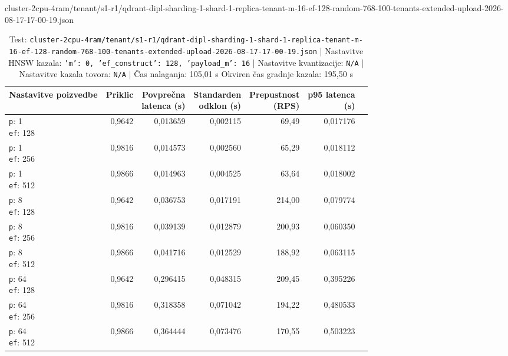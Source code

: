 \begin{table}[htbp]
  \centering
\small
  \caption{cluster-2cpu-4ram/tenant/s1-r1/qdrant-dipl-sharding-1-shard-1-replica-tenant-m-16-ef-128-random-768-100-tenants-extended-upload-2026-08-17-17-00-19.json}
  \label{tab:cluster-2cpu-4ram:tenant:s1-r1:qdrant-dipl-sharding-1-shard-1-replica-tenant-m-16-ef-128-random-768-100-tenants-extended-upload-2026-08-17-17-00-19.json}
  \begin{tabularx}{\textwidth}{Xrrrrrr}
    \toprule
    Nastavitve poizvedbe & Priklic & \makecell{Povprečna\\latenca (s)} & \makecell{Standarden\\odklon (s)} & \makecell{Prepustnost\\(RPS)} & \makecell{p95 latenca\\(s)}  \\
    \midrule
    \makecell{\texttt{p}: 1\\\texttt{ef}: 128} & 0,9642 & 0,013659 & 0,002115 & 69,49 & 0,017176 \\
    \makecell{\texttt{p}: 1\\\texttt{ef}: 256} & 0,9816 & 0,014573 & 0,002560 & 65,29 & 0,018112 \\
    \makecell{\texttt{p}: 1\\\texttt{ef}: 512} & 0,9866 & 0,014963 & 0,004525 & 63,64 & 0,018002 \\
    \makecell{\texttt{p}: 8\\\texttt{ef}: 128} & 0,9642 & 0,036753 & 0,017191 & 214,00 & 0,079774 \\
    \makecell{\texttt{p}: 8\\\texttt{ef}: 256} & 0,9816 & 0,039139 & 0,012879 & 200,93 & 0,060350 \\
    \makecell{\texttt{p}: 8\\\texttt{ef}: 512} & 0,9866 & 0,041716 & 0,012529 & 188,92 & 0,063115 \\
    \makecell{\texttt{p}: 64\\\texttt{ef}: 128} & 0,9642 & 0,296415 & 0,048315 & 209,45 & 0,395226 \\
    \makecell{\texttt{p}: 64\\\texttt{ef}: 256} & 0,9816 & 0,318358 & 0,071042 & 194,22 & 0,480533 \\
    \makecell{\texttt{p}: 64\\\texttt{ef}: 512} & 0,9866 & 0,364444 & 0,073476 & 170,55 & 0,503223 \\
    \bottomrule
  \end{tabularx}
\caption* {Test: \texttt{cluster-2cpu-4ram/tenant/s1-r1/qdrant-dipl-sharding-1-shard-1-replica-tenant-m-16-ef-128-random-768-100-tenants-extended-upload-2026-08-17-17-00-19.json} | Nastavitve HNSW kazala: \texttt{{'m': 0, 'ef\_construct': 128, 'payload\_m': 16}} | Nastavitve kvantizacije: \texttt{N/A} | Nastavitve kazala tovora: \texttt{N/A} | Čas nalaganja: 105,01 s Okviren čas gradnje kazala: 195,50 s}\end{table}


